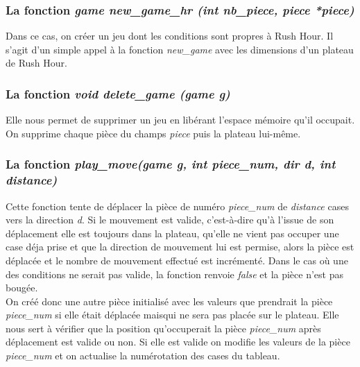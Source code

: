 \documentclass{report}
\begin{document}
\subsubsection{La fonction \textit{game new\_game\_hr (int nb\_piece, piece *piece)}}
Dans ce cas, on créer un jeu dont les conditions sont propres à Rush Hour.
Il s'agit d'un simple appel à la fonction \textit{new\_game} avec les dimensions d'un plateau de Rush Hour.
\subsubsection{La fonction \textit{void delete\_game (game g)}}
Elle nous permet de supprimer un jeu en libérant l'espace mémoire qu'il occupait. On supprime chaque pièce du champs \textit{piece} puis la plateau lui-même.
\subsubsection{La fonction \textit{play\_move(game g, int piece\_num, dir d, int distance)}}
Cette fonction tente de déplacer la pièce de numéro \textit{piece\_num} de \textit{distance} cases vers la direction \textit{d}. Si le mouvement est valide, c'est-à-dire qu'à l'issue de son déplacement elle est toujours dans la plateau, qu'elle ne vient pas occuper une case déja prise et que la direction de mouvement lui est permise, alors la pièce est déplacée et le nombre de mouvement effectué est incrémenté. Dans le cas où une des conditions ne serait pas valide, la fonction renvoie \textit{false} et la pièce n'est pas bougée.\\
On créé donc une autre pièce initialisé avec les valeurs que prendrait la pièce \textit{piece\_num} si elle était déplacée maisqui ne sera pas placée sur le plateau. Elle nous sert à vérifier que la position qu'occuperait la pièce \textit{piece\_num} après déplacement est valide ou non. Si elle est valide on modifie les valeurs de la pièce \textit{piece\_num} et on actualise la numérotation des cases du tableau.
\end{document}
